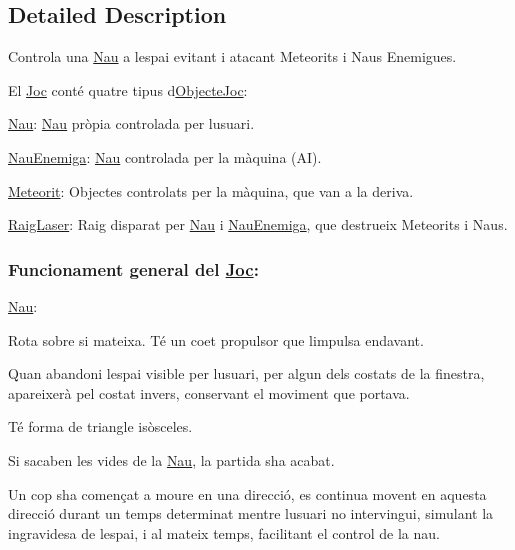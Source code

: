 \subsection{Detailed Description}
Controla una \hyperlink{class_nau}{Nau} a l\textquotesingle{}espai evitant i atacant Meteorits i Naus Enemigues. 

El \hyperlink{class_joc}{Joc} conté quatre tipus d\textquotesingle{}\hyperlink{interface_objecte_joc}{Objecte\+Joc}\+:
\begin{DoxyItemize}
\item \hyperlink{class_nau}{Nau}\+: \hyperlink{class_nau}{Nau} pròpia controlada per l\textquotesingle{}usuari.
\item \hyperlink{class_nau_enemiga}{Nau\+Enemiga}\+: \hyperlink{class_nau}{Nau} controlada per la màquina (A\+I).
\item \hyperlink{class_meteorit}{Meteorit}\+: Objectes controlats per la màquina, que van a la deriva.
\item \hyperlink{class_raig_laser}{Raig\+Laser}\+: Raig disparat per \hyperlink{class_nau}{Nau} i \hyperlink{class_nau_enemiga}{Nau\+Enemiga}, que destrueix Meteorits i Naus.
\end{DoxyItemize}

\subsubsection*{Funcionament general del \hyperlink{class_joc}{Joc}\+: }

\hyperlink{class_nau}{Nau}\+:
\begin{DoxyItemize}
\item Rota sobre si mateixa. Té un coet propulsor que l\textquotesingle{}impulsa endavant.
\item Quan abandoni l\textquotesingle{}espai visible per l\textquotesingle{}usuari, per algun dels costats de la finestra, apareixerà pel costat invers, conservant el moviment que portava.
\item Té forma de triangle isòsceles.
\item Si s\textquotesingle{}acaben les vides de la \hyperlink{class_nau}{Nau}, la partida s\textquotesingle{}ha acabat.
\item Un cop s\textquotesingle{}ha començat a moure en una direcció, es continua movent en aquesta direcció durant un temps determinat mentre l\textquotesingle{}usuari no intervingui, simulant la ingravidesa de l\textquotesingle{}espai, i al mateix temps, facilitant el control de la nau.
\end{DoxyItemize}

